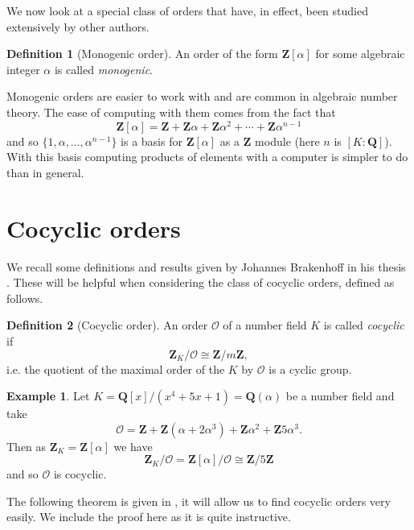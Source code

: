 \documentclass[12pt,a4paper,abstracton,bibtotoc]{scrreprt}
\theoremstyle{definition}
\newtheorem{defn}{Definition}
\newtheorem{ex}{Example}
\newcommand{\QQ}{\mathbf{Q}}
\newcommand{\ZZ}{\mathbf{Z}}
\renewcommand{\O}{\mathcal{O}}
\begin{document}
We now look at a special class of orders that have, in effect, been studied extensively by other authors.

\begin{defn}[Monogenic order]
An order of the form $\ZZ[\alpha]$ for some algebraic integer $\alpha$ is called \emph{monogenic}.
\end{defn}

Monogenic orders are easier to work with and are common in algebraic number theory.
The ease of computing with them comes from the fact that
\[
\ZZ[\alpha] = \ZZ + \ZZ\alpha + \ZZ\alpha^2 + \cdots + \ZZ\alpha^{n-1}
\]
and so $\{1,\alpha,\ldots,\alpha^{n-1}\}$ is a basis for $\ZZ[\alpha]$ as a $\ZZ$ module (here $n$ is $[K : \QQ]$).
With this basis computing products of elements with a computer is simpler to do than in general.




\section{Cocyclic orders}
\label{sec:cocyc}
We recall some definitions and results given by Johannes Brakenhoff in his thesis \cite{brakenhoff}.
These will be helpful when considering the class of cocyclic orders, defined as follows.

\begin{defn}[Cocyclic order]
An order $\O$ of a number field $K$ is called \emph{cocyclic} if
\[
\ZZ_K/\O \cong \ZZ/m\ZZ,
\]
i.e. the quotient of the maximal order of the $K$ by $\O$ is a cyclic group.
\end{defn}

\begin{ex}
\label{ex:cocyc}
Let $K = \QQ[x]/(x^4 + 5x + 1) = \QQ(\alpha)$ be a number field and take
\[
\O = \ZZ + \ZZ(\alpha + 2\alpha^3) + \ZZ\alpha^2 + \ZZ5\alpha^3.
\]
Then as $\ZZ_K = \ZZ[\alpha]$ we have
\[
\ZZ_K/\O = \ZZ[\alpha]/\O \cong \ZZ/5\ZZ
\]
and so $\O$ is cocyclic.
\end{ex}

The following theorem is given in \cite[Thm. 4.1]{brakenhoff}, it will allow us to find cocyclic orders very easily.
We include the proof here as it is quite instructive. %
\end{document}
